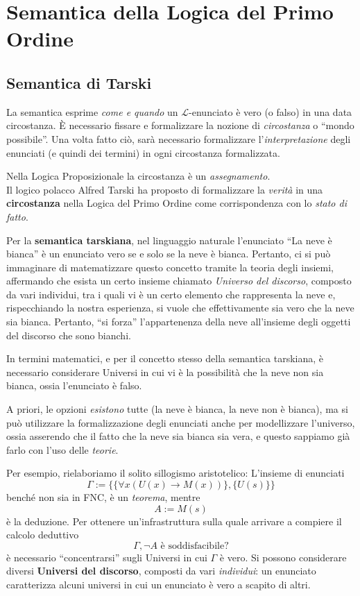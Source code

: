\chapter{Semantica della Logica del Primo Ordine}
\section{Semantica di Tarski}
La semantica esprime \textit{come e quando} un $\mathscr{L}$-enunciato è vero (o falso) in una data circostanza. È necessario fissare e formalizzare la  nozione di \textit{circostanza} o ``mondo possibile''. Una volta fatto ciò, sarà necessario formalizzare l'\textit{interpretazione} degli enunciati (e quindi dei termini) in ogni circostanza formalizzata.

Nella Logica Proposizionale la circostanza è un \textit{assegnamento}. \\
Il logico polacco Alfred Tarski ha proposto di formalizzare la \textit{verità} in una \textbf{circostanza} nella Logica del Primo Ordine come corrispondenza con lo \textit{stato di fatto}. 

Per la \textbf{semantica tarskiana}, nel linguaggio naturale l'enunciato ``La neve è bianca'' è un enunciato vero se e solo se la neve è bianca. 
Pertanto, ci si può immaginare di matematizzare questo concetto 
tramite la teoria degli insiemi, affermando che esista un certo 
insieme chiamato \textit{Universo del discorso}, composto da vari individui,
tra i quali vi è un certo elemento che rappresenta la neve e, 
rispecchiando la nostra esperienza, si vuole che effettivamente sia 
vero che la neve sia bianca. Pertanto, ``si forza'' l'appartenenza 
della neve all'insieme degli oggetti del discorso che sono bianchi. 

In termini matematici, e per il concetto stesso della semantica tarskiana, 
è necessario considerare Universi in cui vi è la possibilità 
che la neve non sia bianca, ossia l'enunciato è falso. 

A priori, le opzioni \textit{esistono} tutte (la neve è bianca, la neve 
non è bianca), ma si può utilizzare la formalizzazione degli enunciati 
anche per modellizzare l'universo, ossia asserendo che il fatto 
che la neve sia bianca sia vera, e questo sappiamo già farlo 
con l'uso delle \textit{teorie}. 

Per esempio, rielaboriamo il solito sillogismo aristotelico: 
L'insieme di enunciati 
$$
\Gamma := \{\{\forall x (U(x) \rightarrow M(x))\}, \{U(s)\}\}
$$
benché non sia in FNC, è un \textit{teorema}, mentre 
$$
A := M(s)
$$
è la deduzione. Per ottenere un'infrastruttura sulla quale arrivare a compiere 
il calcolo deduttivo 
$$
\Gamma, \neg A \text{ è soddisfacibile?}
$$
è necessario ``concentrarsi'' sugli Universi in cui $\Gamma$ è vero. 
Si possono considerare diversi \textbf{Universi del discorso}, composti da vari 
\textit{individui}: un enunciato caratterizza alcuni  universi in cui 
un enunciato è vero a scapito di altri. 

